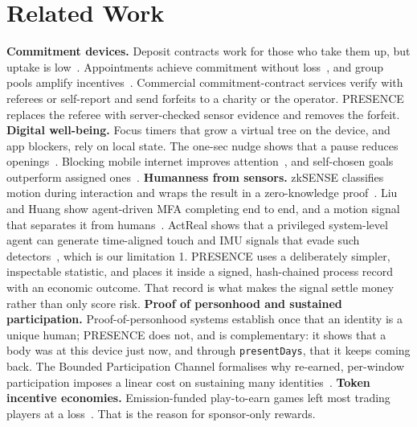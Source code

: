 \documentclass[10pt]{article}
\newcommand{\code}[1]{\texttt{\small #1}}
\begin{document}
\section{Related Work}
\textbf{Commitment devices.} Deposit contracts work for those who take them up, but uptake is low~\cite{halpern2015}.
Appointments achieve commitment without loss~\cite{derksen2021}, and group pools amplify incentives~\cite{kullgren2013}.
Commercial commitment-contract services verify with referees or self-report and send forfeits to a charity or the
operator. PRESENCE replaces the referee with server-checked sensor evidence and removes the forfeit.
\textbf{Digital well-being.} Focus timers that grow a virtual tree on the device, and app blockers, rely on local state.
The one-sec nudge shows that a pause reduces openings~\cite{gruning2023}. Blocking mobile internet improves
attention~\cite{castelo2025}, and self-chosen goals outperform assigned ones~\cite{sachdeva2026}.
\textbf{Humanness from sensors.} zkSENSE classifies motion during interaction and wraps the result in a zero-knowledge
proof~\cite{zksense}. Liu and Huang show agent-driven MFA completing end to end, and a motion signal that separates it
from humans~\cite{liu2026}. ActReal shows that a privileged system-level agent can generate time-aligned touch and IMU
signals that evade such detectors~\cite{actreal2026}, which is our limitation 1. PRESENCE uses a deliberately simpler,
inspectable statistic, and places it inside a signed, hash-chained process record with an economic outcome. That record
is what makes the signal settle money rather than only score risk.
\textbf{Proof of personhood and sustained participation.} Proof-of-personhood systems establish once that an identity is
a unique human; PRESENCE does not, and is complementary: it shows that a body was at this device just now, and through
\code{presentDays}, that it keeps coming back. The Bounded Participation Channel formalises why re-earned, per-window
participation imposes a linear cost on sustaining many identities~\cite{bpc2026}.
\textbf{Token incentive economies.} Emission-funded play-to-earn games left most trading players at a loss~\cite{gao2026}.
That is the reason for sponsor-only rewards.
\end{document}
